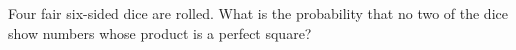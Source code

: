 Four fair six-sided dice are rolled. What is the probability that no two of the dice show numbers whose product is a perfect square?
